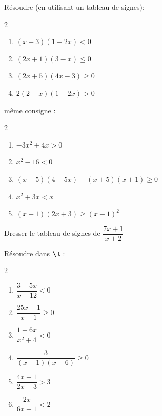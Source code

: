 Résoudre (en utilisant un tableau de signes):

\begin{multicols}{2}
\begin{enumerate}
\item $(x+3)(1-2x) < 0$
\item $(2x+1)(3-x)\leqslant 0$
\item $(2x+5)(4x-3)\geqslant 0$
\item $ 2(2 - x)( 1 -2x) > 0$
\end{enumerate}
\end{multicols}

\medskip

\exo  

même consigne :

\begin{multicols}{2}
\begin{enumerate}
\item $-3x^2+4x >0$
\item $x^2-16 < 0$
\item $(x+5)(4 -5x) -(x+5)(x + 1) \geqslant 0$
\item $x^2 + 3x < x$
\item $(x-1)(2x+3)  \geqslant (x-1)^2$
\end{enumerate}
\end{multicols}

\medskip

\exo 

Dresser le tableau de signes de $\dfrac{7x +1}{x+2}$

\medskip

\exo

Résoudre dans $\R$ :

\begin{multicols}{2}
\begin{enumerate}
\item $\dfrac{3 -5x}{x-12}< 0$
\item $\dfrac{25x-1}{x+1}\geqslant 0$
\item $\dfrac{1-6x}{x^2 + 4} < 0$
\item $\dfrac{3}{(x-1)(x-6)} \geqslant 0$
\item $\dfrac{4x -1}{2x +3} > 3$
\item $ \dfrac{2x}{6x+1}< 2$
\end{enumerate}
\end{multicols}

